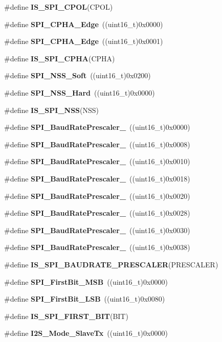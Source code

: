 \begin{DoxyCompactItemize}
\item 
\#define \textbf{ I\+S\+\_\+\+S\+P\+I\+\_\+\+C\+P\+OL}(C\+P\+OL)
\item 
\#define \textbf{ S\+P\+I\+\_\+\+C\+P\+H\+A\+\_\+Edge}~((uint16\+\_\+t)0x0000)
\item 
\#define \textbf{ S\+P\+I\+\_\+\+C\+P\+H\+A\+\_\+Edge}~((uint16\+\_\+t)0x0001)
\item 
\#define \textbf{ I\+S\+\_\+\+S\+P\+I\+\_\+\+C\+P\+HA}(C\+P\+HA)
\item 
\#define \textbf{ S\+P\+I\+\_\+\+N\+S\+S\+\_\+\+Soft}~((uint16\+\_\+t)0x0200)
\item 
\#define \textbf{ S\+P\+I\+\_\+\+N\+S\+S\+\_\+\+Hard}~((uint16\+\_\+t)0x0000)
\item 
\#define \textbf{ I\+S\+\_\+\+S\+P\+I\+\_\+\+N\+SS}(N\+SS)
\item 
\#define \textbf{ S\+P\+I\+\_\+\+Baud\+Rate\+Prescaler\+\_}~((uint16\+\_\+t)0x0000)
\item 
\#define \textbf{ S\+P\+I\+\_\+\+Baud\+Rate\+Prescaler\+\_}~((uint16\+\_\+t)0x0008)
\item 
\#define \textbf{ S\+P\+I\+\_\+\+Baud\+Rate\+Prescaler\+\_}~((uint16\+\_\+t)0x0010)
\item 
\#define \textbf{ S\+P\+I\+\_\+\+Baud\+Rate\+Prescaler\+\_}~((uint16\+\_\+t)0x0018)
\item 
\#define \textbf{ S\+P\+I\+\_\+\+Baud\+Rate\+Prescaler\+\_}~((uint16\+\_\+t)0x0020)
\item 
\#define \textbf{ S\+P\+I\+\_\+\+Baud\+Rate\+Prescaler\+\_}~((uint16\+\_\+t)0x0028)
\item 
\#define \textbf{ S\+P\+I\+\_\+\+Baud\+Rate\+Prescaler\+\_}~((uint16\+\_\+t)0x0030)
\item 
\#define \textbf{ S\+P\+I\+\_\+\+Baud\+Rate\+Prescaler\+\_}~((uint16\+\_\+t)0x0038)
\item 
\#define \textbf{ I\+S\+\_\+\+S\+P\+I\+\_\+\+B\+A\+U\+D\+R\+A\+T\+E\+\_\+\+P\+R\+E\+S\+C\+A\+L\+ER}(P\+R\+E\+S\+C\+A\+L\+ER)
\item 
\#define \textbf{ S\+P\+I\+\_\+\+First\+Bit\+\_\+\+M\+SB}~((uint16\+\_\+t)0x0000)
\item 
\#define \textbf{ S\+P\+I\+\_\+\+First\+Bit\+\_\+\+L\+SB}~((uint16\+\_\+t)0x0080)
\item 
\#define \textbf{ I\+S\+\_\+\+S\+P\+I\+\_\+\+F\+I\+R\+S\+T\+\_\+\+B\+IT}(B\+IT)
\item 
\#define \textbf{ I2\+S\+\_\+\+Mode\+\_\+\+Slave\+Tx}~((uint16\+\_\+t)0x0000)
\item 

\end{DoxyCompactItemize}
